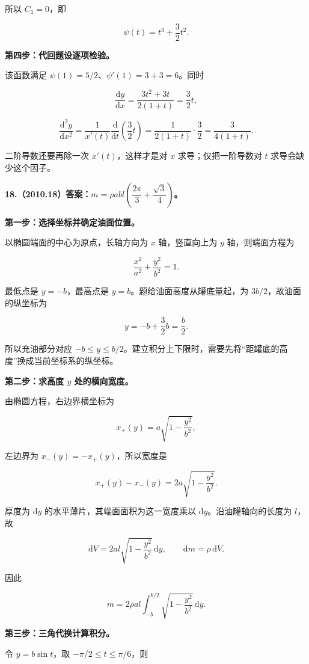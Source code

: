 \documentclass[UTF8,11pt,fontset=windows]{ctexart}
\begin{document}
所以 $C_1=0$，即

$$
\boxed{\psi(t)=t^3+\frac32t^2}.
$$

\textbf{第四步：代回题设逐项检验。}

该函数满足 $\psi(1)=5/2$、$\psi'(1)=3+3=6$。同时

$$
\frac{\mathrm dy}{\mathrm dx}
=\frac{3t^2+3t}{2(1+t)}=\frac32t,
$$

$$
\frac{\mathrm d^2y}{\mathrm dx^2}
=\frac1{x'(t)}\frac{\mathrm d}{\mathrm dt}\left(\frac32t\right)
=\frac1{2(1+t)}\cdot\frac32
=\frac3{4(1+t)}.
$$

二阶导数还要再除一次 $x'(t)$，这样才是对 $x$ 求导；仅把一阶导数对 $t$ 求导会缺少这个因子。

\clearpage

\textbf{18.（2010.18）答案：$m=\rho abl\left(\dfrac{2\pi}{3}+\dfrac{\sqrt3}{4}\right)$。}

\textbf{第一步：选择坐标并确定油面位置。}

以椭圆端面的中心为原点，长轴方向为 $x$ 轴，竖直向上为 $y$ 轴，则端面方程为

$$
\frac{x^2}{a^2}+\frac{y^2}{b^2}=1.
$$

最低点是 $y=-b$，最高点是 $y=b$。题给油面高度从罐底量起，为 $3b/2$，故油面的纵坐标为

$$
y=-b+\frac32b=\frac b2.
$$

所以充油部分对应 $-b\le y\le b/2$。建立积分上下限时，需要先将“距罐底的高度”换成当前坐标系的纵坐标。

\textbf{第二步：求高度 $y$ 处的横向宽度。}

由椭圆方程，右边界横坐标为

$$
x_+(y)=a\sqrt{1-\frac{y^2}{b^2}},
$$

左边界为 $x_-(y)=-x_+(y)$，所以宽度是

$$
x_+(y)-x_-(y)=2a\sqrt{1-\frac{y^2}{b^2}}.
$$

厚度为 $\mathrm dy$ 的水平薄片，其端面面积为这一宽度乘以 $\mathrm dy$。沿油罐轴向的长度为 $l$，故

$$
\mathrm dV=2al\sqrt{1-\frac{y^2}{b^2}}\,\mathrm dy,
\qquad \mathrm dm=\rho\,\mathrm dV.
$$

因此

$$
m=2\rho al\int_{-b}^{b/2}\sqrt{1-\frac{y^2}{b^2}}\,\mathrm dy.
$$

\textbf{第三步：三角代换计算积分。}

令 $y=b\sin t$，取 $-\pi/2\le t\le\pi/6$，则
\end{document}
